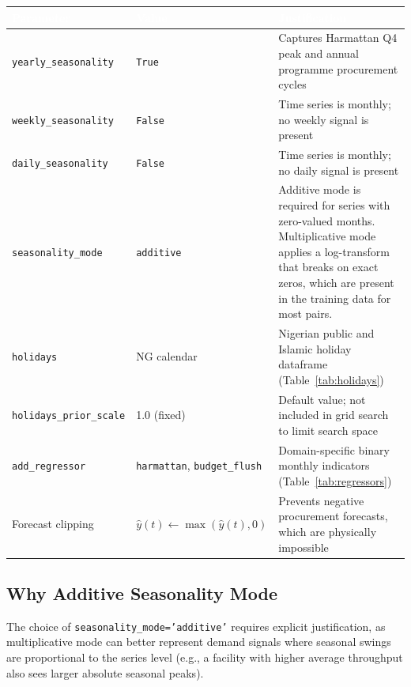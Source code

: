 \documentclass[12pt, a4paper]{article}
\begin{document}
\vspace{0.4em}
\noindent
\begin{tabularx}{\textwidth}{@{} L{4.8cm} L{3cm} X @{}}
  \toprule
  \textcolor{white}{\textbf{Parameter}} &
  \textcolor{white}{\textbf{Value}} &
  \textcolor{white}{\textbf{Justification}} \\
  \midrule
  \texttt{yearly\_seasonality} & \texttt{True} &
    Captures Harmattan Q4 peak and annual programme procurement cycles \\
  \texttt{weekly\_seasonality} & \texttt{False} &
    Time series is monthly; no weekly signal is present \\
  \texttt{daily\_seasonality} & \texttt{False} &
    Time series is monthly; no daily signal is present \\
  \texttt{seasonality\_mode} & \texttt{additive} &
    Additive mode is required for series with zero-valued months.
    Multiplicative mode applies a log-transform that breaks on exact
    zeros, which are present in the training data for most pairs. \\
  \texttt{holidays} & NG calendar &
    Nigerian public and Islamic holiday dataframe (Table~\ref{tab:holidays}) \\
  \texttt{holidays\_prior\_scale} & 1.0 (fixed) &
    Default value; not included in grid search to limit search space \\
  \texttt{add\_regressor} & \texttt{harmattan}, \newline \texttt{budget\_flush} &
    Domain-specific binary monthly indicators (Table~\ref{tab:regressors}) \\
  Forecast clipping & $\hat{y}(t) \leftarrow \max(\hat{y}(t), 0)$ &
    Prevents negative procurement forecasts, which are physically
    impossible \\
  \bottomrule
\end{tabularx}
\vspace{0.3em}

\subsection{Why Additive Seasonality Mode}

The choice of \texttt{seasonality\_mode='additive'} requires explicit
justification, as multiplicative mode can better represent demand signals
where seasonal swings are proportional to the series level (e.g., a
facility with higher average throughput also sees larger absolute seasonal
peaks).
\end{document}
